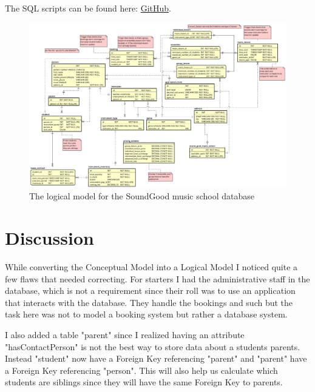 \documentclass[a4paper]{scrreprt}
\begin{document}
The SQL scripts can be found here:
 \href{https://github.com/adrian-jonsson-sjoedin/IV1351-Datalagring/tree/main/project/SQL}{GitHub}.


\begin{figure}[h]
    \begin{center}
        \includegraphics[width=\textwidth]{../img/LogicalModel_v3.png}
        \caption{The logical model for the SoundGood music school database}
        \label{fig:logicalModel}
    \end{center}
\end{figure}



\chapter{Discussion}
While converting the Conceptual Model into a Logical Model I noticed quite a few flaws that needed correcting. For starters I had the administrative staff in the database,
which is not a requirement since their roll was to use an application that interacts with the database. They handle the bookings and such but the task here was not to 
model a booking system but rather a database system. 

I also added a table "parent" since I realized having an attribute "hasContactPerson" is not the best way to store data about a students parents. Instead "student" now 
have a Foreign Key referencing "parent" and "parent" have a Foreign Key referencing "person". This will also help us calculate which students are siblings since they 
will have the same Foreign Key to parents. 
\end{document}
